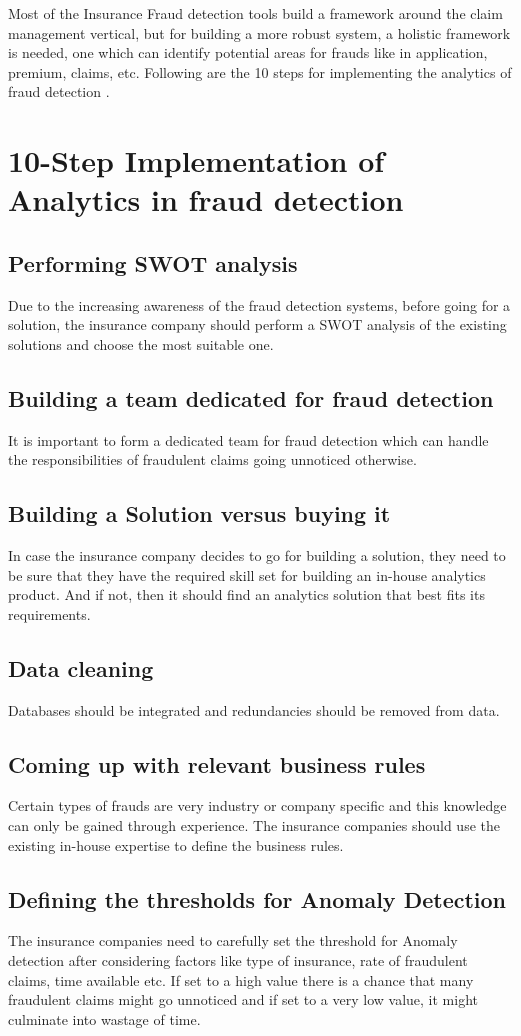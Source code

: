 \documentclass[sigconf]{acmart}
\begin{document}
Most of the Insurance Fraud detection tools build a framework around the claim management vertical, but for building a more robust system, a holistic framework is needed, one which can identify potential areas for frauds like in application, premium, claims, etc. Following are the 10 steps for implementing the analytics of fraud detection \cite{link7}.

\section{10-Step Implementation of Analytics in fraud detection}
\subsection{Performing SWOT analysis}
Due to the increasing awareness of the fraud detection systems, before going for a solution, the insurance company should perform a SWOT analysis of the existing solutions and choose the most suitable one.
\subsection{Building a team dedicated for fraud detection}
It is important to form a dedicated team for fraud detection which can handle the responsibilities of fraudulent claims going unnoticed otherwise.
\subsection{Building a Solution versus buying it}
In case the insurance company decides to go for building a solution, they need to be sure that they have the required skill set for building an in-house analytics product. And if not, then it should find an analytics solution that best fits its requirements. 
\subsection{Data cleaning}
Databases should be integrated and redundancies should be removed from data.
\subsection{Coming up with relevant business rules}
Certain types of frauds are very industry or company specific and this knowledge can only be gained through experience. The insurance companies should use the existing in-house expertise to define the business rules.
\subsection{Defining the thresholds for Anomaly Detection}
The insurance companies need to carefully set the threshold for Anomaly detection after considering factors like type of insurance, rate of fraudulent claims, time available etc. If set to a high value there is a chance that many fraudulent claims might go unnoticed and if set to a very low value, it might culminate into wastage of time.
\end{document}
